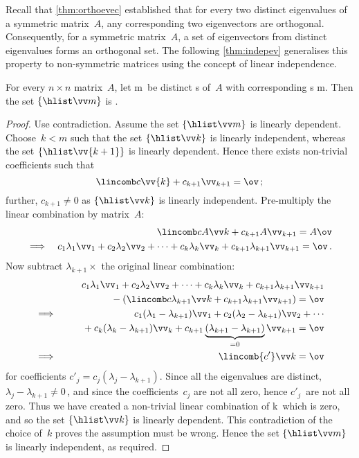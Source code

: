Recall that \autoref{thm:orthoevec} established that for every two distinct {eigenvalue}s of a symmetric matrix~\(A\), any corresponding two {eigenvector}s are {orthogonal}.
Consequently, for a symmetric matrix~\(A\), a set of eigenvectors from distinct eigenvalues forms an orthogonal set.
The following \autoref{thm:indepev} generalises this property to non-symmetric matrices using the concept of linear independence.


\begin{theorem} \label{thm:indepev}
For every \(n\times n\) matrix~\(A\), let \hlist\lambda m\ be distinct s of~\(A\) with corresponding s \hlist\vv m.
Then the set \(\{\hlist \vv m\}\) is .
\end{theorem}
\begin{proof} 
Use contradiction.
Assume the set \(\{\hlist \vv m\}\) is linearly dependent.
Choose~\(k<m\) such that the set \(\{\hlist\vv k\}\) is linearly independent, whereas the set \(\{\hlist\vv{k+1}\}\) is linearly dependent.
Hence there exists non-trivial coefficients such that 
\begin{equation*}
\lincomb c\vv{k}+c_{k+1}\vv_{k+1}=\ov\,;
\end{equation*}
further, \(c_{k+1}\neq0\) as \(\{\hlist\vv k\}\) is linearly independent.
Pre-multiply the linear combination by matrix~\(A\):
\begin{eqnarray*}&&
\lincomb c{A\vv}k+c_{k+1}A\vv_{k+1}=A\ov
\\\implies&&
c_1\lambda_1\vv_1+c_2\lambda_2\vv_2+\cdots+c_k\lambda_k\vv_k+c_{k+1}\lambda_{k+1}\vv_{k+1}=\ov\,.
\end{eqnarray*}
Now subtract \(\lambda_{k+1}\times\) the original linear combination:
\begin{eqnarray*}&&
\phantom{{}+(}c_1\lambda_1\vv_1+c_2\lambda_2\vv_2+\cdots+c_k\lambda_k\vv_k+c_{k+1}\lambda_{k+1}\vv_{k+1}
\\&&{}
-\left(\lincomb c{\lambda_{k+1}\vv}{k}
+c_{k+1}\lambda_{k+1}\vv_{k+1}\right)=\ov
\\\implies&&
c_1(\lambda_1-\lambda_{k+1})\vv_1+c_2(\lambda_2-\lambda_{k+1})\vv_2+\cdots
\\&&{}
+c_k(\lambda_k-\lambda_{k+1})\vv_k
+c_{k+1}\underbrace{(\lambda_{k+1}-\lambda_{k+1})}_{=0}\vv_{k+1}=\ov
\\\implies&&
\lincomb{c'}\vv k=\ov
\end{eqnarray*}
for coefficients \(c'_j=c_j(\lambda_j-\lambda_{k+1})\).
Since all the eigenvalues are distinct, \(\lambda_j-\lambda_{k+1}\neq0\)\,, and since the coefficients~\(c_j\) are not all zero, hence \(c'_j\)~are not all zero.
Thus we have created a non-trivial linear combination of \hlist \vv k\ which is zero, and so the set \(\{\hlist\vv k\}\) is linearly dependent.
This contradiction of the choice of~\(k\) proves the assumption must be wrong.
Hence the set \(\{\hlist \vv m\}\) is linearly independent, as required.
\end{proof}



